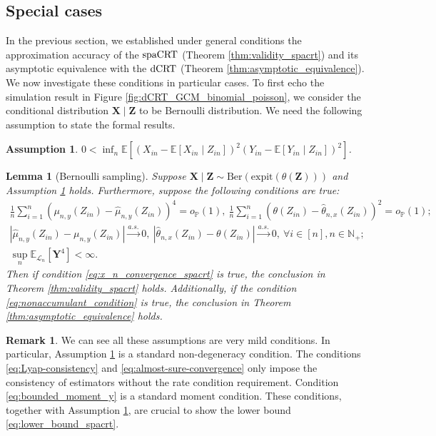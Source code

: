 \documentclass[12pt]{article}
\newtheorem{assumption}{Assumption}
\newtheorem{lemma}{Lemma}
\theoremstyle{definition}
\newtheorem{remark}{Remark}
\def\P{\mathbb{P}}
\def\P{\mathbb{P}}
\newcommand{\E}{\mathbb E}								%
\renewcommand{\P}{\mathbb{P}}							%
\newcommand{\expit}{\mathrm{expit}}                 	%
\newcommand{\prx}{\bm X}								%
\newcommand{\srx}{X}									%
\newcommand{\prz}{\bm Z}								%
\newcommand{\srz}{Z}									%
\newcommand{\pry}{{\bm Y}}								%
\newcommand{\sry}{Y}									%
\newcommand{\law}{\mathcal L}							%
\newcommand{\dCRT}{\textnormal{dCRT}} 					%
\newcommand{\spacrt}{\textnormal{spaCRT}}               %
\begin{document}
\subsection{Special cases}\label{sec:special_results}

In the previous section, we established under general conditions the approximation accuracy of the $\spacrt$ (Theorem \ref{thm:validity_spacrt}) and its asymptotic equivalence with the $\dCRT$ (Theorem \ref{thm:asymptotic_equivalence}). We now investigate these conditions in particular cases. To first echo the simulation result in Figure \ref{fig:dCRT_GCM_binomial_poisson}, we consider the conditional distribution $\prx\mid\prz$ to be Bernoulli distribution. We need the following assumption to state the formal results.

\begin{assumption}\label{assu:non_degeneracy_variance}
$0<\inf_n\E[(\srx_{in}-\E[\srx_{in}\mid \srz_{in}])^2(\sry_{in}-\E[\sry_{in}\mid \srz_{in}])^{2}]$.
\end{assumption}


\begin{lemma}[Bernoulli sampling]\label{lem:bernoulli_case}
	Suppose $\prx\mid\prz \sim \mathrm{Ber}(\expit(\theta(\prz)))$ and Assumption \ref{assu:non_degeneracy_variance} holds. Furthermore, suppose the following conditions are true:
	\begin{align}
		\frac{1}{n}\sum_{i=1}^n (\mu_{n,y}(\srz_{in})-\widehat{\mu}_{n,y}(\srz_{in}))^{4}=o_{\P}(1),\ \frac{1}{n}\sum_{i=1}^n (\theta(\srz_{in})-\widehat \theta_{n,x}(\srz_{in}))^{2}=o_{\P}(1)\label{eq:Lyap-consistency}\tag{IPC};\\
		|\widehat{\mu}_{n,y}(\srz_{in})-\mu_{n,y}(\srz_{in})|\overset{a.s.}{\rightarrow}0,\ |\widehat \theta_{n,x}(\srz_{in})-\theta(\srz_{in})|\overset{a.s.}{\rightarrow}0,\ \forall i\in [n],n\in\mathbb{N}_+\label{eq:almost-sure-convergence}\tag{ASC};\\
		\sup_n\E_{\law_n}[\pry^4]<\infty\label{eq:bounded_moment_y}\tag{FNM}.
	\end{align}
	Then if condition \eqref{eq:x_n_convergence_spacrt} is true, the conclusion in Theorem \ref{thm:validity_spacrt} holds. Additionally, if the condition \eqref{eq:nonaccumulant_condition} is true, the conclusion in Theorem \ref{thm:asymptotic_equivalence} holds.
\end{lemma}

\begin{remark}
  We can see all these assumptions are very mild conditions. In particular, Assumption \ref{assu:non_degeneracy_variance} is a standard non-degeneracy condition. The conditions \eqref{eq:Lyap-consistency} and \eqref{eq:almost-sure-convergence} only impose the consistency of estimators without the rate condition requirement. Condition \eqref{eq:bounded_moment_y} is a standard moment condition. These conditions, together with Assumption \ref{assu:non_degeneracy_variance}, are crucial to show the lower bound \eqref{eq:lower_bound_spacrt}.
\end{remark}
\end{document}
